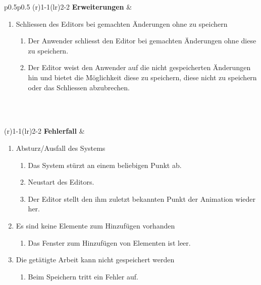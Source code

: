 \begin{longtabu}{p{0.5\textwidth}p{0.5\textwidth}}
    \cmidrule(r){1-1}\cmidrule(lr){2-2}
        \textbf{Erweiterungen} &
        \begin{enumerate}[label= (\alph*)]
            \item{Schliessen des Editors bei gemachten Änderungen ohne zu
                    speichern
                \begin{enumerate}[label= (\roman*)]
                    \item{Der Anwender schliesst den Editor bei gemachten
                            Änderungen ohne diese zu speichern.}
                    \item{Der Editor weist den Anwender auf die
                            nicht gespeicherten Änderungen hin und bietet
                            die Möglichkeit diese zu speichern, diese nicht
                            zu speichern oder das Schliessen abzubrechen.}
                \end{enumerate}
            }\\
        \end{enumerate}\\
    \cmidrule(r){1-1}\cmidrule(lr){2-2}
        \textbf{Fehlerfall} &
        \begin{enumerate}[label= (\alph*)]
            \item{Absturz/Ausfall des Systems
                \begin{enumerate}[label= (\roman*)]
                        \item{Das System stürzt an einem beliebigen Punkt
                                ab.}
                        \item{Neustart des Editors.}
                        \item{Der Editor stellt den ihm zuletzt bekannten
                                Punkt der Animation wieder her.}
                \end{enumerate}
            }
            \item{Es sind keine Elemente zum Hinzufügen vorhanden
                \begin{enumerate}[label= (\roman*)]
                    \item{Das Fenster zum Hinzufügen von Elementen ist leer.}
                \end{enumerate}
            }
            \item{Die getätigte Arbeit kann nicht gespeichert werden
                \begin{enumerate}[label= (\roman*)]
                    \item{Beim Speichern tritt ein Fehler auf.}

\end{enumerate}}
\end{enumerate}
\end{longtabu}
